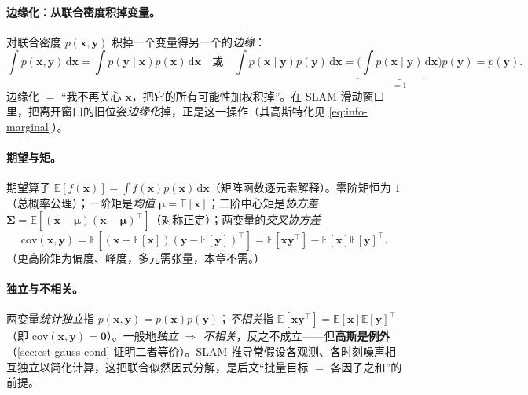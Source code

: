 \paragraph{边缘化：从联合密度积掉变量。}
对联合密度 $p(\mathbf{x},\mathbf{y})$ 积掉一个变量得另一个的\emph{边缘}\cite{barfoot2024state}：
\begin{equation}
  \int p(\mathbf{x},\mathbf{y})\,\mathrm{d}\mathbf{x}
  =\int p(\mathbf{y}\mid\mathbf{x})p(\mathbf{x})\,\mathrm{d}\mathbf{x}
  \quad\text{或}\quad
  \int p(\mathbf{x}\mid\mathbf{y})p(\mathbf{y})\,\mathrm{d}\mathbf{x}=\underbrace{\Big(\textstyle\int p(\mathbf{x}\mid\mathbf{y})\,\mathrm{d}\mathbf{x}\Big)}_{=1}p(\mathbf{y})=p(\mathbf{y}).
  \label{eq:marginalize}
\end{equation}
边缘化 $=$ “我不再关心 $\mathbf{x}$，把它的所有可能性加权积掉”。在 SLAM 滑动窗口里，把离开窗口的旧位姿\emph{边缘化}掉，正是这一操作（其高斯特化见 \cref{eq:info-marginal}）。

\paragraph{期望与矩。}
期望算子 $\mathbb{E}[f(\mathbf{x})]=\int f(\mathbf{x})p(\mathbf{x})\,\mathrm{d}\mathbf{x}$（矩阵函数逐元素解释）。零阶矩恒为 $1$（总概率公理）；一阶矩是\emph{均值} $\boldsymbol{\mu}=\mathbb{E}[\mathbf{x}]$；二阶中心矩是\emph{协方差} $\boldsymbol{\Sigma}=\mathbb{E}[(\mathbf{x}-\boldsymbol{\mu})(\mathbf{x}-\boldsymbol{\mu})^\top]$（对称正定）；两变量的\emph{交叉协方差}
\begin{equation}
  \mathrm{cov}(\mathbf{x},\mathbf{y})=\mathbb{E}[(\mathbf{x}-\mathbb{E}[\mathbf{x}])(\mathbf{y}-\mathbb{E}[\mathbf{y}])^\top]=\mathbb{E}[\mathbf{x}\mathbf{y}^\top]-\mathbb{E}[\mathbf{x}]\mathbb{E}[\mathbf{y}]^\top.
  \label{eq:crosscov}
\end{equation}
（更高阶矩为偏度、峰度，多元需张量，本章不需。）

\paragraph{独立与不相关。}
两变量\emph{统计独立}指 $p(\mathbf{x},\mathbf{y})=p(\mathbf{x})p(\mathbf{y})$；\emph{不相关}指 $\mathbb{E}[\mathbf{x}\mathbf{y}^\top]=\mathbb{E}[\mathbf{x}]\mathbb{E}[\mathbf{y}]^\top$（即 $\mathrm{cov}(\mathbf{x},\mathbf{y})=\mathbf{0}$）。一般地\emph{独立 $\Rightarrow$ 不相关}，反之不成立——但\textbf{高斯是例外}（\cref{sec:est-gauss-cond} 证明二者等价）。SLAM 推导常假设各观测、各时刻噪声相互独立以简化计算，这把联合似然因式分解，是后文“批量目标 $=$ 各因子之和”的前提。

